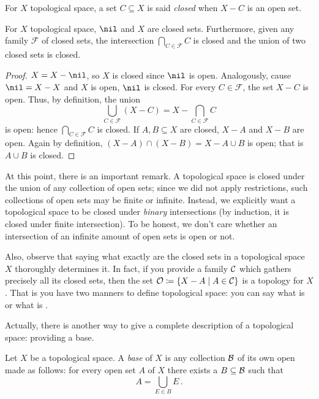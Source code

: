 \begin{definition}
For \(X\) topological space, a set \(C \subseteq X\) is said {\em closed} when \(X-C\) is an open set.
\end{definition}

\begin{theorem}
For \(X\) topological space, \(\nil\) and \(X\) are closed sets. Furthermore, given any family \(\mathcal F\) of closed sets, the intersection \(\bigcap_{C \in \mathcal F} C\) is closed and the union of two closed sets is closed.
\end{theorem}

\begin{proof}
\(X = X - \nil\), so \(X\) is closed since \(\nil\) is open. Analogously, cause \(\nil = X - X\) and \(X\) is open, \(\nil\) is closed.\newline
For every \(C \in \mathcal F\), the set \(X - C\) is open. Thus, by definition, the union
\[\bigcup_{C \in \mathcal F} (X -C) = X - \bigcap_{C \in \mathcal F} C\]
is open: hence \(\bigcap_{C \in \mathcal F} C\) is closed.\newline
If \(A, B \subseteq X\) are closed, \(X-A\) and \(X-B\) are open. Again by definition,
\((X-A) \cap (X-B) = X - A \cup B\)
is open; that is \(A \cup B\) is closed.
\end{proof}

At this point, there is an important remark. A topological space is closed under the union of any collection of open sets; since we did not apply restrictions, such collections of open sets may be finite or infinite. Instead, we explicitly want a topological space to be closed under {\em binary} intersections (by induction, it is closed under finite intersection). To be honest, we don't care whether an intersection of an infinite amount of open sets is open or not.

Also, observe that saying what exactly are the closed sets in a topological space \(X\) thoroughly determines it. In fact, if you provide a family \(\mathcal C\) which gathers precisely all its closed sets, then the set \(\mathcal O \coloneq \left\{X - A \mid A \in \mathcal C\right\}\) is a topology for \(X\). That is you have two manners to define topological space: you can say what is  or what is .

Actually, there is another way to give a complete description of a topological space: providing a base.

\begin{definition}\label{definition:DefBase}
Let \(X\) be a topological space. A {\em base} of \(X\) is any collection \(\mathcal B\) of its own open made as follows: for every open set \(A\) of \(X\) there exists a \(B \subseteq \mathcal B\) such that
\[A = \bigcup_{E \in B} E\,.\] 
\end{definition}

